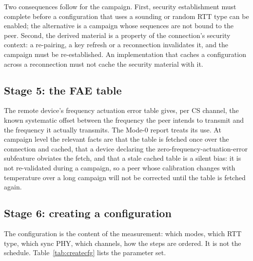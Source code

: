\documentclass[11pt,a4paper]{article}
\begin{document}
Two consequences follow for the campaign. First, security establishment must complete before a
configuration that uses a sounding or random RTT type can be enabled; the alternative is a campaign
whose sequences are not bound to the peer. Second, the derived material is a property of the
connection's security context: a re-pairing, a key refresh or a reconnection invalidates it, and the
campaign must be re-established. An implementation that caches a configuration across a reconnection
must not cache the security material with it.

\subsection{Stage 5: the FAE table}

The remote device's frequency actuation error table gives, per CS channel, the known systematic
offset between the frequency the peer intends to transmit and the frequency it actually transmits.
The Mode-0 report treats its use. At campaign level the relevant facts are that the table is fetched
once over the connection and cached, that a device declaring the zero-frequency-actuation-error
subfeature obviates the fetch, and that a stale cached table is a silent bias: it is not
re-validated during a campaign, so a peer whose calibration changes with temperature over a long
campaign will not be corrected until the table is fetched again.

\subsection{Stage 6: creating a configuration}
\label{sec:config-create}

The configuration is the content of the measurement: which modes, which RTT type, which sync PHY,
which channels, how the steps are ordered. It is not the schedule. Table~\ref{tab:createcfg} lists
the parameter set.
\end{document}
